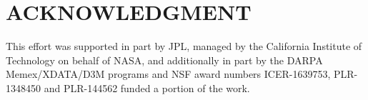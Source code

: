 \documentclass[sigconf]{acmart}
\begin{document}



\maketitle









\section*{ACKNOWLEDGMENT}
This effort was supported in part by JPL, managed by the California Institute of Technology on behalf of NASA, and additionally in part by the DARPA Memex/XDATA/D3M programs and NSF award numbers ICER-1639753, PLR-1348450 and PLR-144562 funded a portion of the work. 


 
\end{document}

